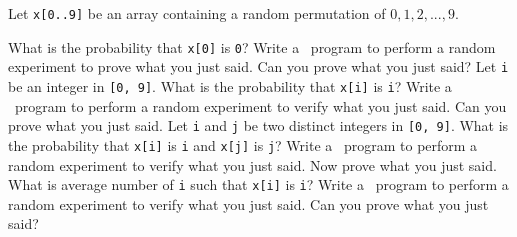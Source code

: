   Let \verb!x[0..9]! be an array containing a random
  permutation of $0,1,2,...,9$.
  \begin{itemize}
    \li
    What is the probability that \verb!x[0]! is \verb!0!?
    Write a \cpp\ program to perform a random experiment
    to prove
    what you just said.
    Can you prove what you just said?
    \li 
    Let \verb!i! be an integer in \verb![0, 9]!.
    What is the probability that \verb!x[i]! is \verb!i!?
    Write a \cpp\ program to perform a random experiment
    to verify what you just said.
    Can you prove what you just said.
    \li 
    Let \verb!i! and \verb!j! be two distinct integers
    in \verb![0, 9]!.
    What is the probability that \verb!x[i]! is \verb!i!
    and \verb!x[j]! is \verb!j!?
    Write a \cpp\ program to perform a random experiment
    to verify what you just said.
    Now prove what you just said.
    \li 
    What is average number of \verb!i! such that 
    \verb!x[i]! is \verb!i!?
    Write a \cpp\ program to perform a random experiment
    to verify what you just said.
    Can you prove what you just said?
  \end{itemize}
